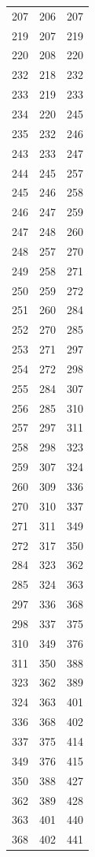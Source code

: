 \begin{tabular}{rrr}
  207 & 206 & 207 \\
  219 & 207 & 219 \\
  220 & 208 & 220 \\
  232 & 218 & 232 \\
  233 & 219 & 233 \\
  234 & 220 & 245 \\
  235 & 232 & 246 \\
  243 & 233 & 247 \\
  244 & 245 & 257 \\
  245 & 246 & 258 \\
  246 & 247 & 259 \\
  247 & 248 & 260 \\
  248 & 257 & 270 \\
  249 & 258 & 271 \\
  250 & 259 & 272 \\
  251 & 260 & 284 \\
  252 & 270 & 285 \\
  253 & 271 & 297 \\
  254 & 272 & 298 \\
  255 & 284 & 307 \\
  256 & 285 & 310 \\
  257 & 297 & 311 \\
  258 & 298 & 323 \\
  259 & 307 & 324 \\
  260 & 309 & 336 \\
  270 & 310 & 337 \\
  271 & 311 & 349 \\
  272 & 317 & 350 \\
  284 & 323 & 362 \\
  285 & 324 & 363 \\
  297 & 336 & 368 \\
  298 & 337 & 375 \\
  310 & 349 & 376 \\
  311 & 350 & 388 \\
  323 & 362 & 389 \\
  324 & 363 & 401 \\
  336 & 368 & 402 \\
  337 & 375 & 414 \\
  349 & 376 & 415 \\
  350 & 388 & 427 \\
  362 & 389 & 428 \\
  363 & 401 & 440 \\
  368 & 402 & 441 \\

\end{tabular}
